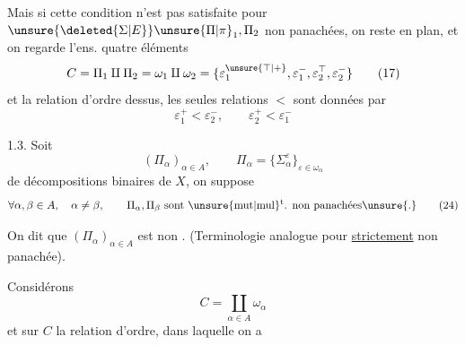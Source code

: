 \begingroup\makeatletter\tagsleft@true\makeatother
Mais si cette condition n'est pas satisfaite pour $\unsure{\deleted{\Sigma|E}}\unsure{\Pi|\pi}_1,\Pi_2$ non panachées, on reste en plan, et on regarde l'ens.  quatre éléments
\[
C=\Pi_1\amalg\Pi_2=\omega_1\amalg\omega_2
=\{\varepsilon_1^{\unsure{\top|+}},\varepsilon_1^-,\varepsilon_2^{\top},\varepsilon_2^-\}
\tag*{(17)}
\]
et la relation d'ordre dessus,  les seules relations $<$ sont données par
\[
\varepsilon_1^+<\varepsilon_2^-,\qquad\varepsilon_2^+<\varepsilon_1^-
\tag*{(22)}
\]

1.3. Soit 
\[
(\Pi_\alpha)_{\alpha\in A},\qquad \Pi_\alpha=\{\Sigma_\alpha^\varepsilon\}_{\varepsilon\in\omega_\alpha}
\tag*{(23)}
\]
   de décompositions binaires de $X$, on suppose 
\[
\forall\alpha,\beta\in A,\quad\alpha\ne\beta,\qquad
\Pi_\alpha,\Pi_\beta\ \text{sont \unsure{mut|mul}\textsuperscript{t}. non panachées\unsure{.}}
\tag*{(24)}
\]

 On dit  que $(\Pi_\alpha)_{\alpha\in A}$ est non . (Terminologie analogue pour \uline{strictement} non panachée).

Considérons
\[
C=\coprod_{\alpha\in A}\omega_\alpha
\tag*{(25)}
\]
et sur $C$ la relation d'ordre, dans laquelle on a

\endgroup
\clearpage
